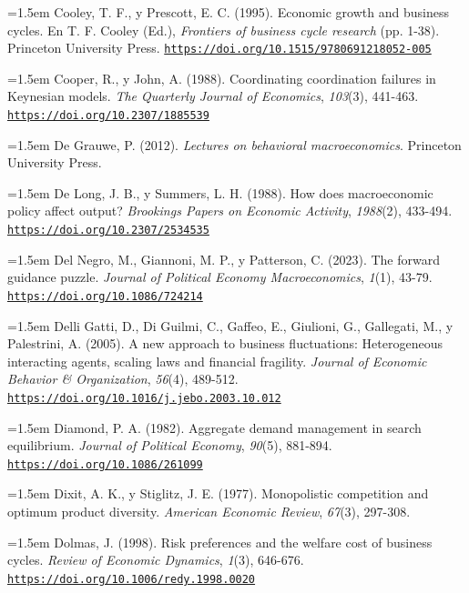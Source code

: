 \documentclass[10pt,a4paper]{article}
\begin{document}
\noindent\hangindent=1.5em Cooley, T. F., y Prescott, E. C. (1995). Economic growth and business cycles. En T. F. Cooley (Ed.), \textit{Frontiers of business cycle research} (pp. 1-38). Princeton University Press. \href{https://doi.org/10.1515/9780691218052-005}{\nolinkurl{https://doi.org/10.1515/9780691218052-005}}

\noindent\hangindent=1.5em Cooper, R., y John, A. (1988). Coordinating coordination failures in Keynesian models. \textit{The Quarterly Journal of Economics}, \textit{103}(3), 441-463. \href{https://doi.org/10.2307/1885539}{\nolinkurl{https://doi.org/10.2307/1885539}}

\noindent\hangindent=1.5em De Grauwe, P. (2012). \textit{Lectures on behavioral macroeconomics}. Princeton University Press.

\noindent\hangindent=1.5em De Long, J. B., y Summers, L. H. (1988). How does macroeconomic policy affect output? \textit{Brookings Papers on Economic Activity}, \textit{1988}(2), 433-494. \href{https://doi.org/10.2307/2534535}{\nolinkurl{https://doi.org/10.2307/2534535}}

\noindent\hangindent=1.5em Del Negro, M., Giannoni, M. P., y Patterson, C. (2023). The forward guidance puzzle. \textit{Journal of Political Economy Macroeconomics}, \textit{1}(1), 43-79. \href{https://doi.org/10.1086/724214}{\nolinkurl{https://doi.org/10.1086/724214}}

{\sloppy\noindent\hangindent=1.5em Delli Gatti, D., Di Guilmi, C., Gaffeo, E., Giulioni, G., Gallegati, M., y Palestrini, A. (2005). A new approach to business fluctuations: Heterogeneous interacting agents, scaling laws and financial fragility. \textit{Journal of Economic Behavior \& Organization}, \textit{56}(4), 489-512. \href{https://doi.org/10.1016/j.jebo.2003.10.012}{\nolinkurl{https://doi.org/10.1016/j.jebo.2003.10.012}}\par}

\noindent\hangindent=1.5em Diamond, P. A. (1982). Aggregate demand management in search equilibrium. \textit{Journal of Political Economy}, \textit{90}(5), 881-894. \href{https://doi.org/10.1086/261099}{\nolinkurl{https://doi.org/10.1086/261099}}

\noindent\hangindent=1.5em Dixit, A. K., y Stiglitz, J. E. (1977). Monopolistic competition and optimum product diversity. \textit{American Economic Review}, \textit{67}(3), 297-308.

\noindent\hangindent=1.5em Dolmas, J. (1998). Risk preferences and the welfare cost of business cycles. \textit{Review of Economic Dynamics}, \textit{1}(3), 646-676. \href{https://doi.org/10.1006/redy.1998.0020}{\nolinkurl{https://doi.org/10.1006/redy.1998.0020}}
\end{document}
